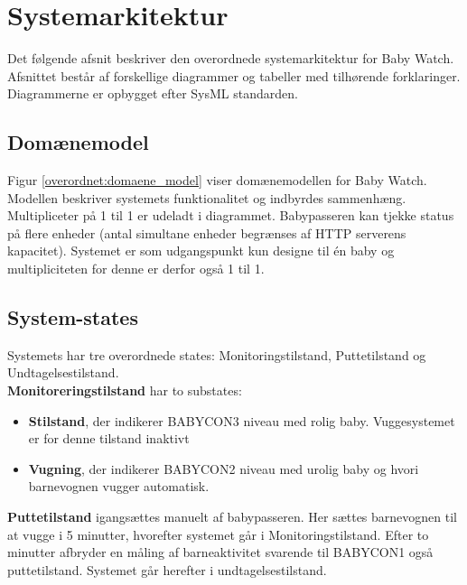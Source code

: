 \section{Systemarkitektur}

Det følgende afsnit beskriver den overordnede systemarkitektur for Baby Watch. Afsnittet består af forskellige diagrammer og tabeller med tilhørende forklaringer. Diagrammerne er opbygget efter SysML standarden.

\subsection{Domænemodel}

Figur \ref{overordnet:domaene_model} viser domænemodellen for Baby Watch. Modellen beskriver systemets funktionalitet og indbyrdes sammenhæng. Multipliceter på 1 til 1 er udeladt i diagrammet. Babypasseren kan tjekke status på flere enheder (antal simultane enheder begrænses af HTTP serverens kapacitet). Systemet er som udgangspunkt kun designe til én baby og multipliciteten for denne er derfor også 1 til 1.

\subsection{System-states}

Systemets har tre overordnede states: Monitoringstilstand, Puttetilstand og Undtagelsestilstand. \\\textbf{Monitoreringstilstand} har to substates: 
\begin{itemize}
	\item \textbf{Stilstand}, der indikerer BABYCON3 niveau med rolig baby. Vuggesystemet er for denne tilstand inaktivt
	\item \textbf{Vugning}, der indikerer BABYCON2 niveau med urolig baby og hvori barnevognen vugger automatisk.
\end{itemize}

\textbf{Puttetilstand} igangsættes manuelt af babypasseren. Her sættes barnevognen til at vugge i 5 minutter, hvorefter systemet går i Monitoringstilstand. Efter to minutter afbryder en måling af barneaktivitet svarende til BABYCON1 også puttetilstand. Systemet går herefter i undtagelsestilstand.

